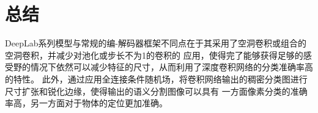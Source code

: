 \documentclass[10pt, a4paper]{article}
\begin{document}
\section{总结}
DeepLab系列模型与常规的编-解码器框架不同点在于其采用了空洞卷积或组合的空洞卷积，并减少对池化或步长不为1的卷积的
应用，使得完了能够获得足够的感受野的情况下依然可以减少特征的尺寸，从而利用了深度卷积网络的分类准确率高的特性。
此外，通过应用全连接条件随机场，将卷积网络输出的稠密分类图进行尺寸扩张和锐化边缘，使得输出的语义分割图像可以具有
一方面像素分类的准确率高，另一方面对于物体的定位更加准确。

\clearpage
\newpage
{}
\nocite{*}
\printbibliography[heading=bibliography,title=参考文献]
\end{document}
